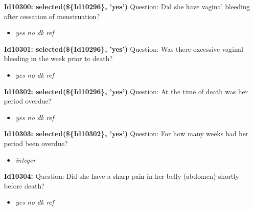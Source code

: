 \documentclass{article}%
\begin{document}
\textbf{Id10300: selected(\$\{Id10296\}, 'yes')\newline%
}%
Question: Did she have vaginal bleeding after cessation of menstruation?\newline%
%
\begin{itemize}%
\item%
\textit{yes\newline%
 no\newline%
 dk\newline%
 ref\newline%
}%
\end{itemize}%
\textbf{Id10301: selected(\$\{Id10296\}, 'yes')\newline%
}%
Question: Was there excessive vaginal bleeding in the week prior to death?\newline%
%
\begin{itemize}%
\item%
\textit{yes\newline%
 no\newline%
 dk\newline%
 ref\newline%
}%
\end{itemize}%
\textbf{Id10302: selected(\$\{Id10296\}, 'yes')\newline%
}%
Question: At the time of death was her period overdue?\newline%
%
\begin{itemize}%
\item%
\textit{yes\newline%
 no\newline%
 dk\newline%
 ref\newline%
}%
\end{itemize}%
\textbf{Id10303: selected(\$\{Id10302\}, 'yes')\newline%
}%
Question: For how many weeks had her period been overdue?\newline%
%
\begin{itemize}%
\item%
\textit{integer\newline%
}%
\end{itemize}%
\textbf{Id10304: \newline%
}%
Question: Did she have a sharp pain in her belly (abdomen) shortly before death?\newline%
%
\begin{itemize}%
\item%
\textit{yes\newline%
 no\newline%
 dk\newline%
 ref\newline%
}%
\end{itemize}%
\end{document}
